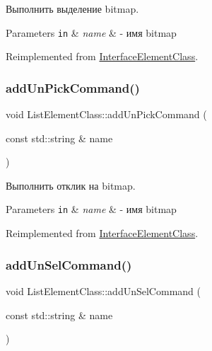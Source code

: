 Выполнить выделение bitmap. 


\begin{DoxyParams}[1]{Parameters}
\mbox{\tt in}  & {\em name} & -\/ имя bitmap \\
\hline
\end{DoxyParams}


Reimplemented from \hyperlink{class_interface_element_class_a47b6374245f1b3a2c56366b8819f1569}{Interface\+Element\+Class}.

\mbox{\label{class_list_element_class_a0dc213a87089450f5b18297b6e56673e}} 
\subsubsection{\texorpdfstring{add\+Un\+Pick\+Command()}{addUnPickCommand()}}
{\footnotesize\ttfamily void List\+Element\+Class\+::add\+Un\+Pick\+Command (\begin{DoxyParamCaption}\item[{const std\+::string \&}]{name }\end{DoxyParamCaption})\hspace{0.3cm}{\ttfamily [virtual]}}



Выполнить отклик на bitmap. 


\begin{DoxyParams}[1]{Parameters}
\mbox{\tt in}  & {\em name} & -\/ имя bitmap \\
\hline
\end{DoxyParams}


Reimplemented from \hyperlink{class_interface_element_class_a318c70a834096462e9ed764f32fe3065}{Interface\+Element\+Class}.

\mbox{\label{class_list_element_class_a8a8930b7a1872ec1aa78be2a1fe4adc6}} 
\subsubsection{\texorpdfstring{add\+Un\+Sel\+Command()}{addUnSelCommand()}}
{\footnotesize\ttfamily void List\+Element\+Class\+::add\+Un\+Sel\+Command (\begin{DoxyParamCaption}\item[{const std\+::string \&}]{name }\end{DoxyParamCaption})\hspace{0.3cm}{\ttfamily [virtual]}}



